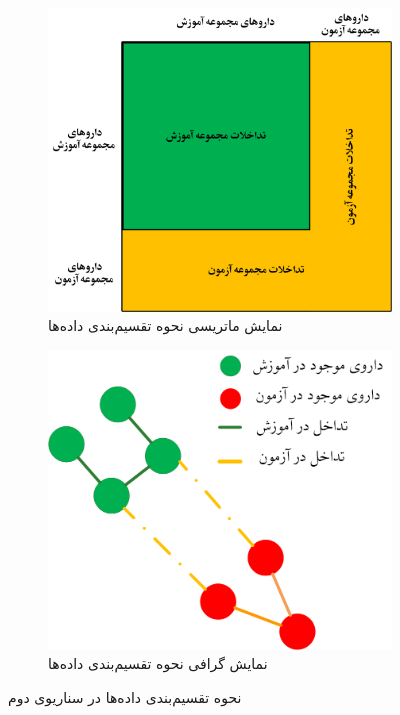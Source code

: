 \begin{figure}[t]
	\centering
	\begin{subfigure}[b]{0.42\textwidth} %
		\centering
		\includegraphics[width=\textwidth]{images/senario-2-matrix.png}
		\caption{نمایش ماتریسی نحوه تقسیم‌بندی داده‌ها}
		\label{fig:senario-2-matrix}
	\end{subfigure}
	\hspace{0.04\textwidth} %
	\begin{subfigure}[b]{0.42\textwidth} %
		\centering
		\includegraphics[width=\textwidth]{images/senario-2-graph.png}
		\caption{نمایش گرافی نحوه تقسیم‌بندی داده‌ها}
		\label{fig:senario-2-graph}
	\end{subfigure}
	\caption{نحوه تقسیم‌بندی داده‌ها در سناریوی دوم}
	\label{fig:senario-2}
\end{figure}

